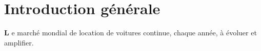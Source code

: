 \section{Introduction générale}
\setlength{\parindent}{40pt}
\lettrine[findent=2pt]{\textbf{L}}{ }e marché mondial de location de voitures continue, chaque année, à évoluer et amplifier.